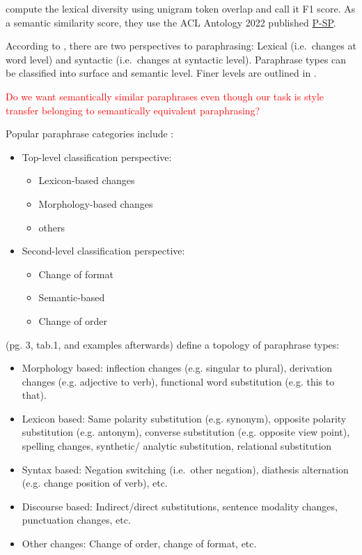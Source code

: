 \citet{krishna_paraphrasing_2023} compute the lexical diversity using unigram token overlap and call it F1 score.
As a semantic similarity score, they use the ACL Antology 2022 published \href{https://aclanthology.org/2022.emnlp-demos.38.pdf}{P-SP}.

According to \citet{gohsen_task_oriented_2024}, there are two perspectives to paraphrasing: 
Lexical (i.e.\ changes at word level) and syntactic (i.e.\ changes at syntactic level).
Paraphrase types can be classified into surface and semantic level. Finer levels are outlined in \citep{gohsen_task_oriented_2024}.

\textcolor{red}{Do we want semantically similar paraphrases even though our task is style transfer belonging to semantically equivalent paraphrasing?}

Popular paraphrase categories include \citep{fu_learning_2024}:
\begin{itemize}
    \item Top-level classification perspective: 
        \begin{itemize}
            \item Lexicon-based changes
            \item Morphology-based changes
            \item others
        \end{itemize}
    \item Second-level classification perspective:
        \begin{itemize}
            \item Change of format
            \item Semantic-based
            \item Change of order
        \end{itemize}
\end{itemize}
\citet{zhou_paraphrase_2025} (pg. 3, tab.1, and examples afterwards) define a topology of paraphrase types:
\begin{itemize}
    \item Morphology based: inflection changes (e.g. singular to plural), derivation changes (e.g. adjective to verb), functional word substitution (e.g. this to that).
    \item Lexicon based: Same polarity substitution (e.g. synonym), opposite polarity substitution (e.g. antonym), converse substitution (e.g. opposite view point), spelling changes, synthetic/ analytic substitution, relational substitution
    \item Syntax based: Negation switching (i.e.\ other negation), diathesis alternation (e.g. change position of verb), etc.
    \item Discourse based: Indirect/direct substitutions, sentence modality changes, punctuation changes, etc.
    \item Other changes: Change of order, change of format, etc.
\end{itemize}

